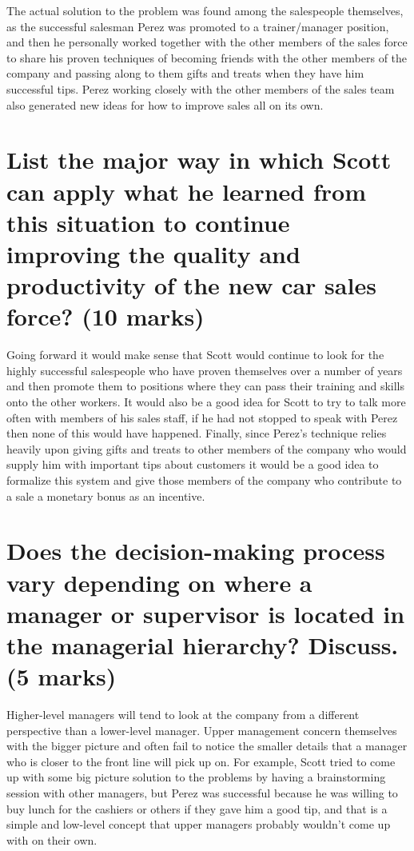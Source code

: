 \documentclass[letterpaper,12pt,titlepage]{article}
\begin{document}
The actual solution to the problem was found among the salespeople themselves, as the successful salesman Perez was promoted to a trainer/manager position, and then he personally worked together with the other members of the sales force to share his proven techniques of becoming friends with the other members of the company and passing along to them gifts and treats when they have him successful tips. Perez working closely
with the other members of the sales team also generated new ideas
for how to improve sales all on its own.

\section{List the major way in which Scott can apply what he learned from this situation to continue improving the quality and productivity of the new car sales force? (10 marks)}

Going forward it would make sense that Scott would continue to look for the highly successful salespeople who have proven themselves over a number of years and then promote them to positions where they can pass their training and skills onto the other workers. It would also be a good idea for Scott to try to talk more often with members of his sales staff, if he had not stopped to speak with Perez then none of this would have happened. Finally, since Perez's technique relies heavily upon giving gifts and treats to other members of the company who would supply him with important tips about customers it would
be a good idea to formalize this system and give those members of
the company who contribute to a sale a monetary bonus as an incentive.

\section{Does the decision-making process vary depending on where a manager or supervisor is located in the managerial hierarchy? Discuss. (5 marks)}

Higher-level managers will tend to look at the company from a different perspective than a lower-level manager. Upper management concern themselves with the bigger picture and often fail to notice the smaller details that a manager who is closer to the front line will pick up on. For example, Scott tried to come up with some big picture solution to the problems by having a brainstorming session with other managers, but Perez was successful because he was willing to buy lunch for the cashiers or others if they gave him a good tip, and that is a simple
and low-level concept that upper managers probably wouldn't come up with on their own.
\end{document}
